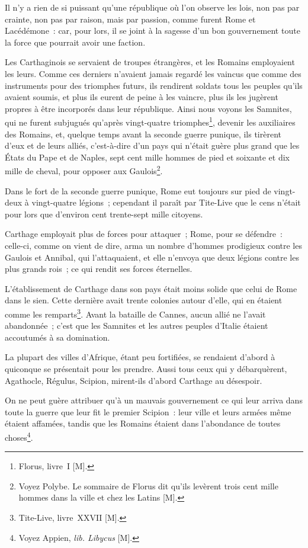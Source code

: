\documentclass[french,twoside]{book} %
\begin{document}
Il n’y a rien de si puissant qu’une république où l’on observe les lois, non pas par crainte, non pas par raison, mais par passion, comme furent Rome et Lacédémone : car, pour lors, il se joint à la sagesse d’un bon gouvernement toute la force que pourrait avoir une faction.\par
Les Carthaginois se servaient de troupes étrangères, et les Romains employaient les leurs. Comme ces derniers n’avaient jamais regardé les vaincus que comme des instruments pour des triomphes futurs, ils rendirent soldats tous les peuples qu’ils avaient soumis, et plus ils eurent de peine à les vaincre, plus ils les jugèrent propres à être incorporés dans leur république. Ainsi nous voyons les Samnites, qui ne furent subjugués qu’après vingt-quatre triomphes\footnote{Florus, livre I [M].}, devenir les auxiliaires des Romains, et, quelque temps avant la seconde guerre punique, ils tirèrent d’eux et de leurs alliés, c’est-à-dire d’un pays qui n’était guère plus grand que les États du Pape et de Naples, sept cent mille hommes de pied et soixante et dix mille de cheval, pour opposer aux Gaulois\footnote{Voyez Polybe. Le sommaire de Florus dit qu’ils levèrent trois cent mille hommes dans la ville et chez les Latins [M].}.\par
Dans le fort de la seconde guerre punique, Rome eut toujours sur pied de vingt-deux à vingt-quatre légions ; cependant il paraît par Tite-Live que le cens n’était pour lors que d’environ cent trente-sept mille citoyens.\par
Carthage employait plus de forces pour attaquer ; Rome, pour se défendre : celle-ci, comme on vient de dire, arma un nombre d’hommes prodigieux contre les Gaulois et Annibal, qui l’attaquaient, et elle n’envoya que deux légions contre les plus grands rois ; ce qui rendit ses forces éternelles.\par
L’établissement de Carthage dans son pays était moins solide que celui de Rome dans le sien. Cette dernière avait trente colonies autour d’elle, qui en étaient comme les remparts\footnote{Tite-Live, livre XXVII [M].}. Avant la bataille de Cannes, aucun allié ne l’avait abandonnée ; c’est que les Samnites et les autres peuples d’Italie étaient accoutumés à sa domination.\par
La plupart des villes d’Afrique, étant peu fortifiées, se rendaient d’abord à quiconque se présentait pour les prendre. Aussi tous ceux qui y débarquèrent, Agathocle, Régulus, Scipion, mirent-ils d’abord Carthage au désespoir.\par
On ne peut guère attribuer qu’à un mauvais gouvernement ce qui leur arriva dans toute la guerre que leur fit le premier Scipion : leur ville et leurs armées même étaient affamées, tandis que les Romains étaient dans l’abondance de toutes choses\footnote{Voyez Appien, {\itshape lib. Libycus} [M].}.\par
\end{document}
